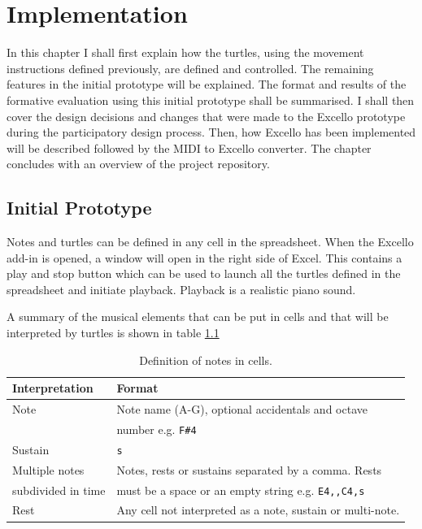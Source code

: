 \chapter{Implementation}

In this chapter I shall first explain how the turtles, using the movement instructions defined previously, are defined and controlled. The remaining features in the initial prototype will be explained. The format and results of the formative evaluation using this initial prototype shall be summarised. I shall then cover the design decisions and changes that were made to the Excello prototype during the participatory design process. Then, how Excello has been implemented will be described followed by the MIDI to Excello converter. The chapter concludes with an overview of the project repository.

\section{Initial Prototype}

Notes and turtles can be defined in any cell in the spreadsheet. When the Excello add-in is opened, a window will open in the right side of Excel. This contains a play and stop button which can be used to launch all the turtles defined in the spreadsheet and initiate playback. Playback is a realistic piano sound.

A summary of the musical elements that can be put in cells and that will be interpreted by turtles is shown in table \ref{tab:cells}

\begin{table}
\centering
\caption{Definition of notes in cells.}
\begin{tabular}{|l|l|} \hline
\textbf{Interpretation}&\textbf{Format}\\ \hline
Note& Note name (A-G), optional accidentals and octave \\
&number e.g. \texttt{F\#4}\\ \hline
Sustain& \texttt{s}\\ \hline
Multiple notes& Notes, rests or sustains separated by a comma. Rests \\
subdivided in time& must be a space or an empty string e.g. \texttt{E4,,C4,s}\\ \hline
Rest& Any cell not interpreted as a note, sustain or multi-note. \\ \hline
\end{tabular}
\label{tab:cells}
\end{table}

